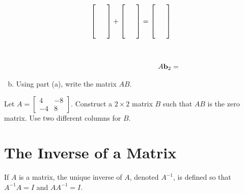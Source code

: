 \begin{exercise}
\begin{multicols}{2}
\begin{enumerate}[(a)]
\begin{align*}
			\begin{bmatrix}\phantom{--}\\{}\\{}\\{}\end{bmatrix} +
			\begin{bmatrix}\phantom{--}\\{}\\{}\\{}\end{bmatrix} = \begin{bmatrix}\phantom{--}\\{}\\{}\\{}\end{bmatrix}\\ \\ \\
			A\boldsymbol{\mathbf{b}}_2 &=
			\end{align*}
			\item Using part (a), write the matrix $AB$.
		\end{enumerate}
	\end{multicols}
\end{exercise}
\vfill


\begin{exercise} %
	Let $A=\begin{bmatrix}4&-8\\-4&8\end{bmatrix}$. Construct a $2\times 2$ matrix $B$ such that $AB$ is the zero matrix. Use two different columns for $B$.
\end{exercise}
\vfill


\newpage


\section{The Inverse of a Matrix}
\name


\begin{boxdef}
	If $A$ is a matrix, the unique inverse of $A$, denoted $A^{-1}$, is defined so that $A^{-1}A=I$ and $AA^{-1}=I$.
\end{boxdef}
\vspace{-1em}

